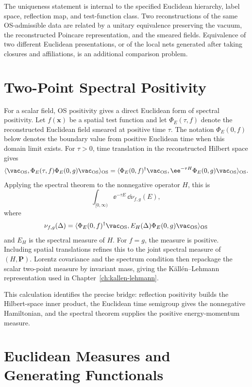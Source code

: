 The uniqueness statement is internal to the specified Euclidean hierarchy,
label space, reflection map, and test-function class.  Two reconstructions of
the same OS-admissible data are related by a unitary equivalence preserving the
vacuum, the reconstructed Poincare representation, and the smeared fields.
Equivalence of two different Euclidean presentations, or of the local nets
generated after taking closures and affiliations, is an additional comparison
problem.

\section{Two-Point Spectral Positivity}

For a scalar field, OS positivity gives a direct Euclidean form of spectral
positivity.  Let \(f(\mathbf x)\) be a spatial test function and let
\(\Phi_E(\tau,f)\) denote the reconstructed Euclidean field smeared at
positive time \(\tau\).  The notation \(\Phi_E(0,f)\) below denotes the
boundary value from positive Euclidean time when this domain limit exists.
For \(\tau>0\), time translation in the reconstructed Hilbert space gives
\[
  \langle \vac_{\rm OS},
  \Phi_E(\tau,f)\Phi_E(0,g)\vac_{\rm OS}\rangle_{\rm OS}
  =
  \langle \Phi_E(0,f)^\dagger\vac_{\rm OS},
  \ee^{-\tau H}\Phi_E(0,g)\vac_{\rm OS}\rangle_{\rm OS}.
\]
Applying the spectral theorem to the nonnegative operator \(H\), this is
\[
  \int_{[0,\infty)} \ee^{-\tau E}\,
  \dd\nu_{f,g}(E),
\]
where
\[
  \nu_{f,g}(\Delta)
  =
  \langle \Phi_E(0,f)^\dagger\vac_{\rm OS},
  E_H(\Delta)\Phi_E(0,g)\vac_{\rm OS}\rangle_{\rm OS}
\]
and \(E_H\) is the spectral measure of \(H\).  For \(f=g\), the measure is
positive.  Including spatial translations refines this to the joint spectral
measure of \((H,\mathbf P)\).  Lorentz covariance and the spectrum condition
then repackage the scalar two-point measure by invariant mass, giving the
K\"all\'en--Lehmann representation used in Chapter~\ref{ch:kallen-lehmann}.

This calculation identifies the precise bridge: reflection positivity builds
the Hilbert-space inner product, the Euclidean time semigroup gives the
nonnegative Hamiltonian, and the spectral theorem supplies the positive
energy-momentum measure.

\section{Euclidean Measures and Generating Functionals}

